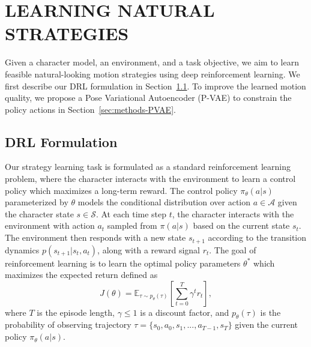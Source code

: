 \section{LEARNING NATURAL STRATEGIES}
\label{sec:discovery}
Given a character model, an environment, and a task objective, we aim to learn feasible natural-looking motion strategies using deep reinforcement learning. We first describe our DRL formulation in Section~\ref{sec:methods-DRL-formulation}. To improve the learned motion quality, we propose a Pose Variational Autoencoder (P-VAE) to constrain the policy actions in Section~\ref{sec:methods-PVAE}.

\subsection{DRL Formulation}
\label{sec:methods-DRL-formulation}
Our strategy learning task is formulated as a standard reinforcement learning problem, where the character interacts with the environment to learn a control policy which maximizes a long-term reward. The control policy $\pi_\theta(a|s)$ parameterized by $\theta$ models the conditional distribution over action $a \in \mathcal{A}$ given the character state $s \in \mathcal{S}$. At each time step $t$, the character interacts with the environment with action $a_t$ sampled from $\pi(a|s)$ based on the current state $s_t$. The environment then responds with a new state $s_{t+1}$ according to the transition dynamics $p(s_{t+1}|s_t,a_t)$, along with a reward signal $r_t$. The goal of reinforcement learning is to learn the optimal policy parameters $\theta^*$ which maximizes the expected return defined as
\begin{equation}
    J(\theta) = \mathbb{E}_{\tau\sim p_\theta(\tau)}\left[
        \sum_{t=0}^T{\gamma^t r_t}
    \right],
\end{equation}
where $T$ is the episode length, $\gamma \leq 1$ is a discount factor, and $p_\theta(\tau)$ is the probability of observing trajectory $\tau = \{s_0, a_0, s_1, ..., a_{T-1}, s_T\}$ given the current policy $\pi_\theta(a|s)$.

